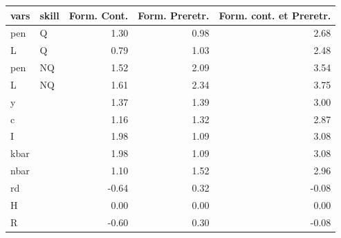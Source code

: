 \begin{tabular}{llrrr}
  \hline
vars & skill & Form. Cont. & Form. Preretr. & Form. cont. et Preretr. \\ 
  \hline
pen & Q & 1.30 & 0.98 & 2.68 \\ 
  L & Q & 0.79 & 1.03 & 2.48 \\ 
  pen & NQ & 1.52 & 2.09 & 3.54 \\ 
  L & NQ & 1.61 & 2.34 & 3.75 \\ 
  y &  & 1.37 & 1.39 & 3.00 \\ 
  c &  & 1.16 & 1.32 & 2.87 \\ 
  I &  & 1.98 & 1.09 & 3.08 \\ 
  kbar &  & 1.98 & 1.09 & 3.08 \\ 
  nbar &  & 1.10 & 1.52 & 2.96 \\ 
  rd &  & -0.64 & 0.32 & -0.08 \\ 
  H &  & 0.00 & 0.00 & 0.00 \\ 
  R &  & -0.60 & 0.30 & -0.08 \\ 
   \hline
\end{tabular}
